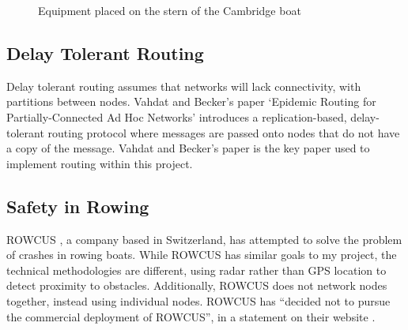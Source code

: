 \documentclass[12pt,a4paper]{report}
\begin{document}
\begin{figure}[h]
\begin{center}
\end{center}
\caption{Equipment placed on the stern of the Cambridge boat \cite{mike}}
\end{figure}
\FloatBarrier

\subsection{Delay Tolerant Routing}
Delay tolerant routing assumes that networks will lack connectivity, with partitions between nodes. Vahdat and Becker's paper `Epidemic Routing for Partially-Connected Ad Hoc Networks'  \cite{epidemic} introduces a replication-based, delay-tolerant routing protocol where messages are passed onto nodes that do not have a copy of the message. Vahdat and Becker's paper is the key paper used to implement routing within this project. 

\subsection{Safety in Rowing}
ROWCUS \cite{rowcus}, a company based in Switzerland, has attempted to solve the problem of crashes in rowing boats. While ROWCUS has similar goals to my project, the technical methodologies are different, using radar rather than GPS location to detect proximity to obstacles. Additionally, ROWCUS does not network nodes together, instead using individual nodes. ROWCUS has ``decided not to pursue the commercial deployment of ROWCUS'', in a statement on their website \cite{rowcus}.



\end{document}
